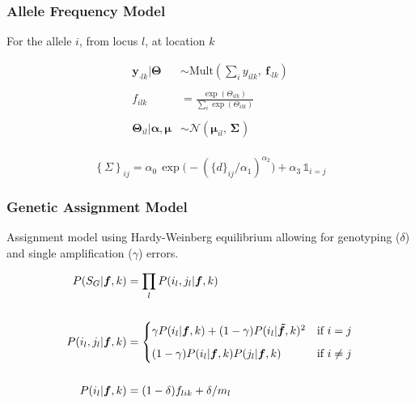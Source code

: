 \documentclass[t]{beamer}\usepackage[]{graphicx}\usepackage[]{color}
\begin{document}
\begin{frame}[t]
\end{frame}


\begin{frame}
\frametitle{Allele Frequency Model}

For the allele $i$, from locus $l$, at location $k$

\begin{align*}
\bm{y}_{\cdot l k}|\bm{\Theta} &\sim \text{Mult}\left(\textstyle\sum_i y_{ilk},\: \bm{f}_{\cdot l k}\right) \\
\\
f_{ilk} &= \frac{\exp(\Theta_{ilk})}{\sum_i \exp(\Theta_{ilk})} \\
\\
\bm{\Theta}_{il}|\bm{\alpha},\bm{\mu} &\sim \mathcal{N}( \bm{\mu}_{il},\, \bm{\Sigma_{}}) \\
\end{align*}

\[ \left\{\Sigma\right\}_{ij} = \alpha_0 \, \exp \Big(-(\{d\}_{ij}/\alpha_1)^{\alpha_2} \Big) + \alpha_3 \, \mathds{1}_{i=j} \]

\end{frame}




\begin{frame}
\frametitle{Genetic Assignment  Model}

Assignment model using Hardy-Weinberg equilibrium allowing for genotyping ($\delta$) and single amplification ($\gamma$) errors.

\begin{align*}
P(S_G|\bm{f},k) &= \prod_l P(i_l, j_l | \bm{f},k) \\
\\
P(i_l, j_l | \bm{f},k) &= 
\begin{cases}
\gamma P(i_l|\bm{f},k) + (1-\gamma)P(i_l|\bm{\tilde f},k)^2 & \text{if $i=j$} \vspace{2mm} \\
(1-\gamma) P(i_l|\bm{f},k) P(j_l|\bm{f},k)      & \text{if $i \ne j$}
\end{cases} \\
\\
P(i_l|\bm{f},k) &= (1-\delta) f_{lik} + \delta / m_l
\end{align*}

\end{frame}
\end{document}
